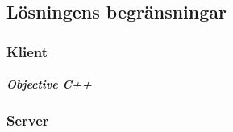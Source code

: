 \documentclass[10pt, titlepage, oneside, a4paper]{article}
\begin{document}
		\newpage
    	\subsection{Lösningens begränsningar}
    		\subsubsection{Klient}
    		\subparagraph{Objective C++}
    		\subsubsection{Server}
\end{document}
